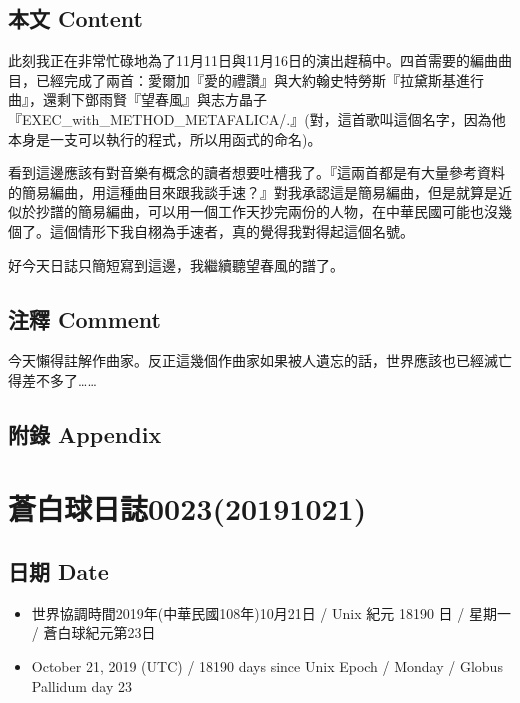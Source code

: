\documentclass[a5paper, 12pt
]{book}
\providecommand{\tightlist}{%
  \setlength{\itemsep}{0pt}\setlength{\parskip}{0pt}}
\begin{document}
\hypertarget{ux672cux6587-content-19}{%
\subsection{本文 Content}\label{ux672cux6587-content-19}}

此刻我正在非常忙碌地為了11月11日與11月16日的演出趕稿中。四首需要的編曲曲目，已經完成了兩首：愛爾加『愛的禮讚』與大約翰史特勞斯『拉黛斯基進行曲』，還剩下鄧雨賢『望春風』與志方晶子『EXEC\_with\_METHOD\_METAFALICA/.』(對，這首歌叫這個名字，因為他本身是一支可以執行的程式，所以用函式的命名)。

看到這邊應該有對音樂有概念的讀者想要吐槽我了。『這兩首都是有大量參考資料的簡易編曲，用這種曲目來跟我談手速？』對我承認這是簡易編曲，但是就算是近似於抄譜的簡易編曲，可以用一個工作天抄完兩份的人物，在中華民國可能也沒幾個了。這個情形下我自栩為手速者，真的覺得我對得起這個名號。

好今天日誌只簡短寫到這邊，我繼續聽望春風的譜了。

\hypertarget{ux6ce8ux91cb-comment-15}{%
\subsection{注釋 Comment}\label{ux6ce8ux91cb-comment-15}}

今天懶得註解作曲家。反正這幾個作曲家如果被人遺忘的話，世界應該也已經滅亡得差不多了\ldots\ldots{}

\hypertarget{ux9644ux9304-appendix-14}{%
\subsection{附錄 Appendix}\label{ux9644ux9304-appendix-14}}

\hypertarget{ux84bcux767dux7403ux65e5ux8a8c002320191021}{%
\section{蒼白球日誌0023(20191021)}\label{ux84bcux767dux7403ux65e5ux8a8c002320191021}}

\hypertarget{ux65e5ux671f-date-20}{%
\subsection{日期 Date}\label{ux65e5ux671f-date-20}}

\begin{itemize}
\tightlist
\item
  世界協調時間2019年(中華民國108年)10月21日 / Unix 紀元 18190 日 /
  星期一 / 蒼白球紀元第23日
\item
  October 21, 2019 (UTC) / 18190 days since Unix Epoch / Monday / Globus
  Pallidum day 23
\end{itemize}
\end{document}
